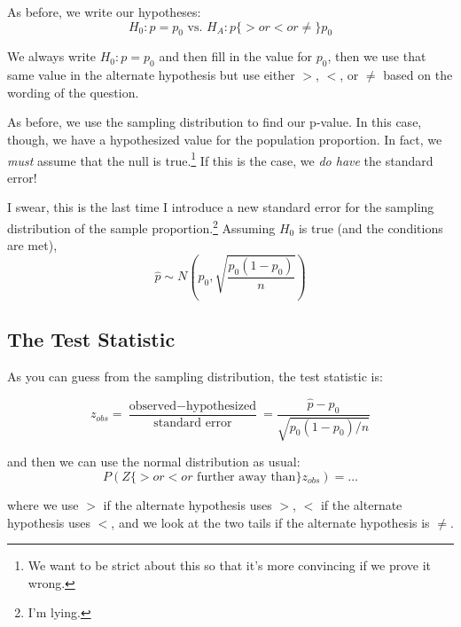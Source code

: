 \documentclass[
  letterpaper,
  DIV=11,
  numbers=noendperiod,
  oneside]{scrreprt}
\begin{document}
As before, we write our hypotheses: \[
H_0:p = p_0 \text{ vs. } H_A: p \{>or<or\ne\} p_0
\]

We always write \(H_0:p = p_0\) and then fill in the value for \(p_0\),
then we use that same value in the alternate hypothesis but use either
\(>\), \(<\), or \(\ne\) based on the wording of the question.

As before, we use the sampling distribution to find our p-value. In this
case, though, we have a hypothesized value for the population
proportion. In fact, we \emph{must} assume that the null is
true.\footnote{We want to be strict about this so that it's more
  convincing if we prove it wrong.} If this is the case, we \emph{do
have} the standard error!

I swear, this is the last time I introduce a new standard error for the
sampling distribution of the sample proportion.\footnote{I'm lying.}
Assuming \(H_0\) is true (and the conditions are met), \[
\hat p \sim N\left(p_0, \sqrt{\frac{p_0(1-p_0)}{n}}\right)
\]

\hypertarget{the-test-statistic}{%
\subsection{The Test Statistic}\label{the-test-statistic}}

As you can guess from the sampling distribution, the test statistic is:

\begin{tcolorbox}[enhanced jigsaw, toprule=.15mm, colbacktitle=quarto-callout-note-color!10!white, title=\textcolor{quarto-callout-note-color}{\faInfo}\hspace{0.5em}{Test Statistic for a Test for Proportions}, arc=.35mm, colframe=quarto-callout-note-color-frame, colback=white, titlerule=0mm, left=2mm, bottomtitle=1mm, bottomrule=.15mm, breakable, opacitybacktitle=0.6, leftrule=.75mm, toptitle=1mm, coltitle=black, rightrule=.15mm, opacityback=0]

\[
z_{obs} = \frac{\text{observed} - \text{hypothesized}}{\text{standard error}} = \frac{\hat p - p_0}{\sqrt{p_0(1-p_0)/n}}
\]

\end{tcolorbox}

and then we can use the normal distribution as usual: \[
P(Z \{>or<or\text{ further away than}\} z_{obs}) = \dots
\]

where we use \(>\) if the alternate hypothesis uses \(>\), \(<\) if the
alternate hypothesis uses \(<\), and we look at the two tails if the
alternate hypothesis is \(\ne\).
\end{document}
